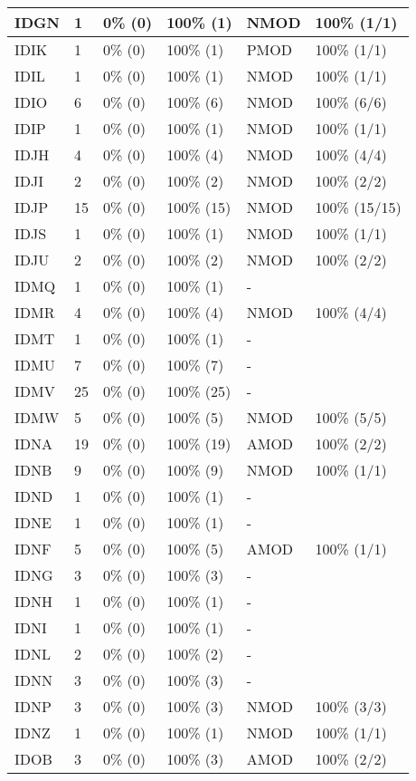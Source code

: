 \begin{figure*}
\begin{tabular}{|l|l|l|l||l|l|}
\hline
 IDGN & 1 & 0\% (0) & 100\% (1) & NMOD & 100\% (1/1) \\ 
\hline
 IDIK & 1 & 0\% (0) & 100\% (1) & PMOD & 100\% (1/1) \\ 
\hline
 IDIL & 1 & 0\% (0) & 100\% (1) & NMOD & 100\% (1/1) \\ 
\hline
 IDIO & 6 & 0\% (0) & 100\% (6) & NMOD & 100\% (6/6) \\ 
\hline
 IDIP & 1 & 0\% (0) & 100\% (1) & NMOD & 100\% (1/1) \\ 
\hline
 IDJH & 4 & 0\% (0) & 100\% (4) & NMOD & 100\% (4/4) \\ 
\hline
 IDJI & 2 & 0\% (0) & 100\% (2) & NMOD & 100\% (2/2) \\ 
\hline
 IDJP & 15 & 0\% (0) & 100\% (15) & NMOD & 100\% (15/15) \\ 
\hline
 IDJS & 1 & 0\% (0) & 100\% (1) & NMOD & 100\% (1/1) \\ 
\hline
 IDJU & 2 & 0\% (0) & 100\% (2) & NMOD & 100\% (2/2) \\ 
\hline
 IDMQ & 1 & 0\% (0) & 100\% (1) & - &  \\ 
\hline
 IDMR & 4 & 0\% (0) & 100\% (4) & NMOD & 100\% (4/4) \\ 
\hline
 IDMT & 1 & 0\% (0) & 100\% (1) & - &  \\ 
\hline
 IDMU & 7 & 0\% (0) & 100\% (7) & - &  \\ 
\hline
 IDMV & 25 & 0\% (0) & 100\% (25) & - &  \\ 
\hline
 IDMW & 5 & 0\% (0) & 100\% (5) & NMOD & 100\% (5/5) \\ 
\hline
 IDNA & 19 & 0\% (0) & 100\% (19) & AMOD & 100\% (2/2) \\ 
\hline
 IDNB & 9 & 0\% (0) & 100\% (9) & NMOD & 100\% (1/1) \\ 
\hline
 IDND & 1 & 0\% (0) & 100\% (1) & - &  \\ 
\hline
 IDNE & 1 & 0\% (0) & 100\% (1) & - &  \\ 
\hline
 IDNF & 5 & 0\% (0) & 100\% (5) & AMOD & 100\% (1/1) \\ 
\hline
 IDNG & 3 & 0\% (0) & 100\% (3) & - &  \\ 
\hline
 IDNH & 1 & 0\% (0) & 100\% (1) & - &  \\ 
\hline
 IDNI & 1 & 0\% (0) & 100\% (1) & - &  \\ 
\hline
 IDNL & 2 & 0\% (0) & 100\% (2) & - &  \\ 
\hline
 IDNN & 3 & 0\% (0) & 100\% (3) & - &  \\ 
\hline
 IDNP & 3 & 0\% (0) & 100\% (3) & NMOD & 100\% (3/3) \\ 
\hline
 IDNZ & 1 & 0\% (0) & 100\% (1) & NMOD & 100\% (1/1) \\ 
\hline
 IDOB & 3 & 0\% (0) & 100\% (3) & AMOD & 100\% (2/2) \\ 
\hline
\end{tabular}
\end{figure*}
